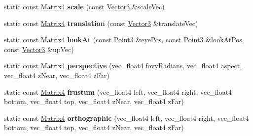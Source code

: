 \begin{DoxyCompactItemize}
\item 
\hypertarget{classVectormath_1_1Soa_1_1Matrix4_a11f77bd52610acc1e711a083393a846f}{static const \hyperlink{classVectormath_1_1Soa_1_1Matrix4}{Matrix4} {\bfseries scale} (const \hyperlink{classVectormath_1_1Soa_1_1Vector3}{Vector3} \&scale\-Vec)}\label{classVectormath_1_1Soa_1_1Matrix4_a11f77bd52610acc1e711a083393a846f}

\item 
\hypertarget{classVectormath_1_1Soa_1_1Matrix4_a10f9a46a37ce7fdfe3b855e37f0e5de3}{static const \hyperlink{classVectormath_1_1Soa_1_1Matrix4}{Matrix4} {\bfseries translation} (const \hyperlink{classVectormath_1_1Soa_1_1Vector3}{Vector3} \&translate\-Vec)}\label{classVectormath_1_1Soa_1_1Matrix4_a10f9a46a37ce7fdfe3b855e37f0e5de3}

\item 
\hypertarget{classVectormath_1_1Soa_1_1Matrix4_aebac61852819566ddf01eab93e0cfd36}{static const \hyperlink{classVectormath_1_1Soa_1_1Matrix4}{Matrix4} {\bfseries look\-At} (const \hyperlink{classVectormath_1_1Soa_1_1Point3}{Point3} \&eye\-Pos, const \hyperlink{classVectormath_1_1Soa_1_1Point3}{Point3} \&look\-At\-Pos, const \hyperlink{classVectormath_1_1Soa_1_1Vector3}{Vector3} \&up\-Vec)}\label{classVectormath_1_1Soa_1_1Matrix4_aebac61852819566ddf01eab93e0cfd36}

\item 
\hypertarget{classVectormath_1_1Soa_1_1Matrix4_a80039d3399157c8169c7ccd45bf8a440}{static const \hyperlink{classVectormath_1_1Soa_1_1Matrix4}{Matrix4} {\bfseries perspective} (vec\-\_\-float4 fovy\-Radians, vec\-\_\-float4 aspect, vec\-\_\-float4 z\-Near, vec\-\_\-float4 z\-Far)}\label{classVectormath_1_1Soa_1_1Matrix4_a80039d3399157c8169c7ccd45bf8a440}

\item 
\hypertarget{classVectormath_1_1Soa_1_1Matrix4_a28bcc3fc31932d7fc2aaaef6ad8c96cc}{static const \hyperlink{classVectormath_1_1Soa_1_1Matrix4}{Matrix4} {\bfseries frustum} (vec\-\_\-float4 left, vec\-\_\-float4 right, vec\-\_\-float4 bottom, vec\-\_\-float4 top, vec\-\_\-float4 z\-Near, vec\-\_\-float4 z\-Far)}\label{classVectormath_1_1Soa_1_1Matrix4_a28bcc3fc31932d7fc2aaaef6ad8c96cc}

\item 
\hypertarget{classVectormath_1_1Soa_1_1Matrix4_aafb9e2c427c8e4c927478cbc0e58da3c}{static const \hyperlink{classVectormath_1_1Soa_1_1Matrix4}{Matrix4} {\bfseries orthographic} (vec\-\_\-float4 left, vec\-\_\-float4 right, vec\-\_\-float4 bottom, vec\-\_\-float4 top, vec\-\_\-float4 z\-Near, vec\-\_\-float4 z\-Far)}\label{classVectormath_1_1Soa_1_1Matrix4_aafb9e2c427c8e4c927478cbc0e58da3c}

\end{DoxyCompactItemize}


